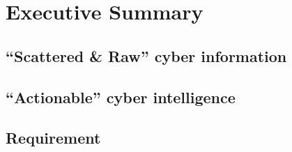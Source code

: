 
\chapter{Executive Summary} %

\label{AppendixA} %

\section{\enquote{Scattered \& Raw} cyber information}\label{fig:cyber-feed-info-appendix}


\begin{figure}[b!]
  \centering
{}
  
\end{figure}
\FloatBarrier

\section{\enquote{Actionable} cyber intelligence}\label{fig:cyber-feed-intel-appendix}


\begin{figure}[b!]
  \centering
{}

  
\end{figure}
\FloatBarrier
\bigbreak

\section{Requirement}
\label{tab:requirement-appendix}
